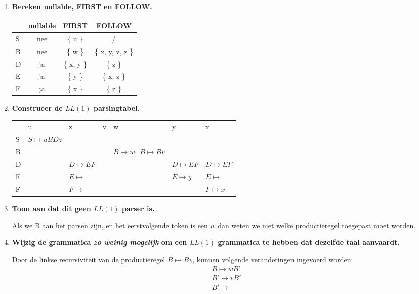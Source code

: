 \begin{enumerate}
	\item \textbf{Bereken nullable, FIRST en FOLLOW.}
	\begin{table}[h]
		\centering
		\begin{tabular}{| l | c | c | c |}
			\hline
			& nullable & FIRST & FOLLOW \\
			\hline
			S & nee & \{ u \}    & /	 			\\
			B & nee & \{ w \}    & \{ x, y, v, z \}	\\
			D & ja  & \{ x, y \} & \{ z \}			\\
			E & ja  & \{ y \}    & \{ x, z \}		\\
			F & ja  & \{ x \}    & \{ z \}			\\
			\hline
		\end{tabular}
	\end{table}

	\item \textbf{Construeer de $LL(1)$ parsingtabel.}
	\begin{table}[h]
		\centering
		\begin{tabular}{| l | l | l | l | l | l | l |}
			\hline
			   & u 					& z & v & w & y & x \\
			 S & $S \mapsto uBDz$  	&   &   &   &   &   \\
			 B &   					&   &   & $B \mapsto w, \; B \mapsto Bv$  &   &   \\
			 D &  					& $D \mapsto EF$  &   &   & $D \mapsto EF$  & $D \mapsto EF$   \\
			 E &   					& $E \mapsto $  &   &   & $E \mapsto y$  &  $E \mapsto $ \\
			 F &   					& $F \mapsto $  &   &   &   &  $F \mapsto x$ \\
			\hline
		\end{tabular}
	\end{table}

	\item \textbf{Toon aan dat dit geen $LL(1)$ parser is.}
	
	Als we B aan het parsen zijn, en het eerstvolgende token is een $w$ dan weten we niet welke productieregel toegepast moet worden.
	
	\item \textbf{Wijzig de grammatica \emph{zo weinig mogelijk} om een $LL(1)$ grammatica te hebben dat dezelfde taal aanvaardt.}
	
	Door de linkse recursiviteit van de productieregel $B \mapsto Bv$, kunnen volgende veranderingen ingevoerd worden:
	\begin{equation*}
		\begin{split}
		& B \mapsto wB' \\
		& B' \mapsto vB' \\
		& B' \mapsto 
		\end{split}
	\end{equation*}
\end{enumerate}

